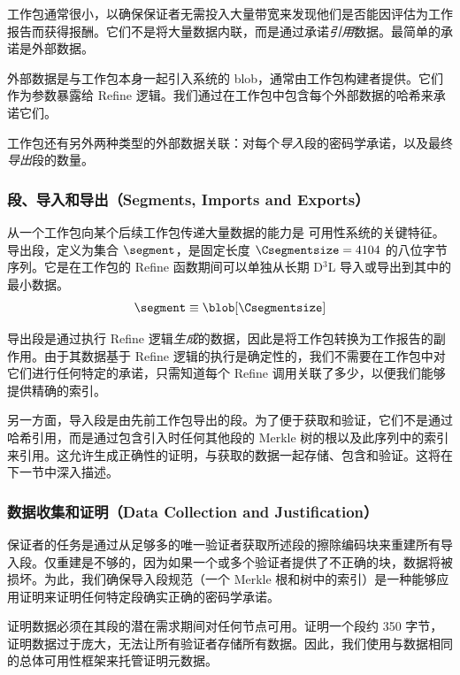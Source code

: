 工作包通常很小，以确保保证者无需投入大量带宽来发现他们是否能因评估为工作报告而获得报酬。它们不是将大量数据内联，而是通过承诺\emph{引用}数据。最简单的承诺是外部数据。

外部数据是与工作包本身一起引入系统的 blob，通常由工作包构建者提供。它们作为参数暴露给 Refine 逻辑。我们通过在工作包中包含每个外部数据的哈希来承诺它们。

工作包还有另外两种类型的外部数据关联：对每个\emph{导入}段的密码学承诺，以及最终\emph{导出}段的数量。

\subsubsection{段、导入和导出（Segments, Imports and Exports）}
\label{sec:segments}

从一个工作包向某个后续工作包传递大量数据的能力是 \Jam 可用性系统的关键特征。导出段，定义为集合 $\segment$，是固定长度 $\Csegmentsize = 4104$ 的八位字节序列。它是在工作包的 Refine 函数期间可以单独从长期 D$^3$L 导入或导出到其中的最小数据。
\begin{equation}\label{eq:segment}
  \segment \equiv \blob[\Csegmentsize]
\end{equation}

导出段是通过执行 Refine 逻辑\emph{生成}的数据，因此是将工作包转换为工作报告的副作用。由于其数据基于 Refine 逻辑的执行是确定性的，我们不需要在工作包中对它们进行任何特定的承诺，只需知道每个 Refine 调用关联了多少，以便我们能够提供精确的索引。

另一方面，导入段是由先前工作包导出的段。为了便于获取和验证，它们不是通过哈希引用，而是通过包含引入时任何其他段的 Merkle 树的根以及此序列中的索引来引用。这允许生成正确性的证明，与获取的数据一起存储、包含和验证。这将在下一节中深入描述。

\subsubsection{数据收集和证明（Data Collection and Justification）}


保证者的任务是通过从足够多的唯一验证者获取所述段的擦除编码块来重建所有导入段。仅重建是不够的，因为如果一个或多个验证者提供了不正确的块，数据将被损坏。为此，我们确保导入段规范（一个 Merkle 根和树中的索引）是一种能够应用证明来证明任何特定段确实正确的密码学承诺。

证明数据必须在其段的潜在需求期间对任何节点可用。证明一个段约 350 字节，证明数据过于庞大，无法让所有验证者存储所有数据。因此，我们使用与数据相同的总体可用性框架来托管证明元数据。

